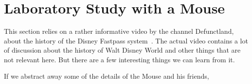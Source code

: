 \section*{Laboratory Study with a Mouse}

This section relies on a rather informative video by the channel Defunctland, about the history of the Disney Fastpass system~\cite{dldisney}. The actual video contains a lot of discussion about the history of Walt Disney World and other things that are not relevant here. But there are a few interesting things we can learn from it.

If we abstract away some of the details of the Mouse and his friends, 




